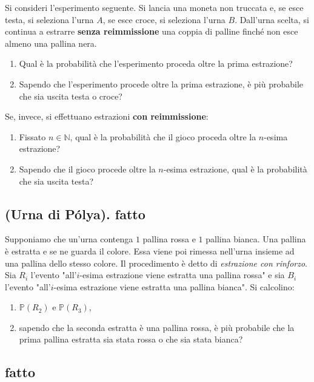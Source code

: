 Si consideri l'esperimento seguente. Si lancia una moneta non truccata e, se esce testa, si seleziona l'urna $A$, se esce croce, si seleziona l'urna $B$. Dall'urna scelta, si continua a estrarre \textbf{senza reimmissione} una coppia di palline finché non esce almeno una pallina nera.
\begin{enumerate}
\item Qual è la probabilità che l'esperimento proceda oltre la prima estrazione?
\item Sapendo che l'esperimento procede oltre la prima estrazione, è più probabile che sia uscita testa o croce?
\end{enumerate}

Se, invece, si effettuano estrazioni \textbf{con reimmissione}:
\begin{enumerate}
\item Fissato $n\in \mathbb{N}$, qual è la probabilità che il gioco proceda oltre la $n$-esima estrazione?
\item Sapendo che il gioco procede oltre la $n$-esima estrazione, qual è la probabilità che sia uscita testa?
\end{enumerate}
\subsection{(Urna di Pólya). fatto}

Supponiamo che un'urna contenga $1$ pallina rossa e $1$ pallina bianca. Una pallina è estratta e se ne guarda il colore. Essa viene poi rimessa nell'urna insieme ad una pallina dello stesso colore. Il procedimento è detto di \textit{estrazione con rinforzo}. Sia $R_{i}$ l'evento "all'$i$-esima estrazione viene estratta una pallina rossa" e sia $B_{i}$ l'evento "all'$i$-esima estrazione viene estratta una pallina bianca". Si calcolino:
\begin{enumerate}
\item $\mathbb{P}( R_{2})$ e $\mathbb{P}( R_{3})$,
\item sapendo che la seconda estratta è una pallina rossa, è più probabile che la prima pallina estratta sia stata rossa o che sia stata bianca?
\end{enumerate}
\subsection{fatto}

